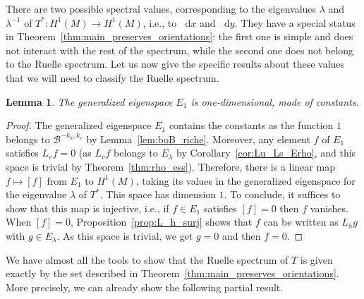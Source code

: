 \documentclass[11pt, a4paper, oneside, final, pagebackref]{amsart}
\newcommand{\boB}{\mathcal{B}}
\newcommand{\dd}{\mathop{}\!\mathrm{d}}
\newtheorem{lem}[thm]{Lemma}
\theoremstyle{definition}
\numberwithin{equation}{section}
\begin{document}
There are two possible spectral values, corresponding to the eigenvalues
$\lambda$ and $\lambda^{-1}$ of $T^*: H^1(M) \to H^1(M)$, i.e., to $\dd x$
and $\dd y$. They have a special status in
Theorem~\ref{thm:main_preserves_orientations}: the first one is simple and
does not interact with the rest of the spectrum, while the second one does
not belong to the Ruelle spectrum. Let us now give the specific results about
these values that we will need to classify the Ruelle spectrum.

\begin{lem}
\label{lem:E1} The generalized eigenspace $E_1$ is one-dimensional, made of
constants.
\end{lem}
\begin{proof}
The generalized eigenspace $E_1$ contains the constants as the function $1$
belongs to $\boB^{-k_h, k_v}$ by Lemma~\ref{lem:boB_riche}. Moreover, any
element $f$ of $E_1$ satisfies $L_v f = 0$ (as $L_v f$ belongs to
$E_{\lambda}$ by  Corollary~\ref{cor:Lu_Ls_Erho}, and this space is trivial
by Theorem~\ref{thm:rho_ess}). Therefore, there is a linear map $f \mapsto
[f]$ from $E_1$ to $H^1(M)$, taking its values in the generalized eigenspace
for the eigenvalue $\lambda$ of $T^*$. This space has dimension $1$. To
conclude, it suffices to show that this map is injective, i.e., if $f\in E_1$
satisfies $[f] = 0$ then $f$ vanishes. When $[f] = 0$,
Proposition~\ref{prop:L_h_surj} shows that $f$ can be written as $L_h g$ with
$g \in E_{\lambda}$. As this space is trivial, we get $g=0$ and then $f=0$.
\end{proof}


We have almost all the tools to show that the Ruelle spectrum of $T$ is given
exactly by the set described in
Theorem~\ref{thm:main_preserves_orientations}. More precisely, we can already
show the following partial result.
\end{document}
